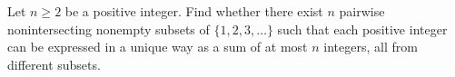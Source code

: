 Let $n\ge 2$ be a positive integer. Find whether there exist $n$ pairwise nonintersecting nonempty subsets of $\{1, 2, 3, \ldots \}$ such that each positive integer can be expressed in a unique way as a sum of at most $n$ integers, all from different subsets.